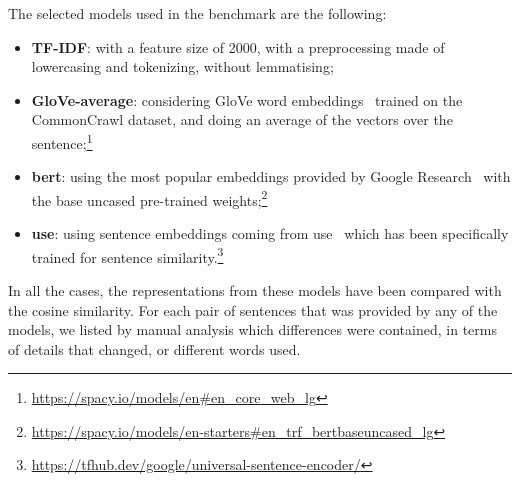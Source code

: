 The selected models used in the benchmark are the following:
\begin{itemize}
    \item \textbf{TF-IDF}: with a feature size of 2000, with a preprocessing made of lowercasing and tokenizing, without lemmatising;
    \item \textbf{GloVe-average}: considering GloVe word embeddings~\citep{pennington2014glove} trained on the CommonCrawl dataset, and doing an average of the vectors over the sentence;\footnote{\url{https://spacy.io/models/en\#en_core_web_lg}}
    \item \textbf{\acrshort{bert}}: using the most popular embeddings provided by Google Research~\citep{devlin2018bert} with the base uncased pre-trained weights;\footnote{\url{https://spacy.io/models/en-starters\#en_trf_bertbaseuncased_lg}}
    \item \textbf{\acrshort{use}}: using sentence embeddings coming from \acrfull{use}~\citep{cer2018universal} which has been specifically trained for sentence similarity.\footnote{\url{https://tfhub.dev/google/universal-sentence-encoder/}}
\end{itemize}

In all the cases, the representations from these models have been compared with the cosine similarity.
For each pair of sentences that was provided by any of the models, we listed by manual analysis which differences were contained, in terms of details that changed, or different words used.

